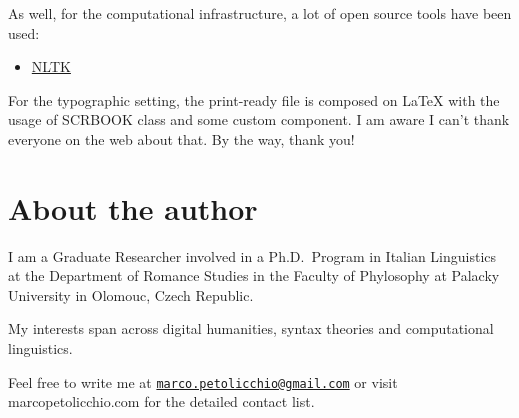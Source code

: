 \documentclass[a4paper,twoside,11pt,chapterprefix=false,bibliography=totocnumbered]{scrbook}
\providecommand{\tightlist}{%
  \setlength{\itemsep}{0pt}\setlength{\parskip}{0pt}}
\theoremstyle{definition}
\theoremstyle{definition}
\theoremstyle{definition}
\theoremstyle{remark}
\begin{document}
As well, for the computational infrastructure, a lot of open source
tools have been used:

\begin{itemize}
\tightlist
\item
  \href{https://bookdown.org}{NLTK}
\end{itemize}

For the typographic setting, the print-ready file is composed on LaTeX
with the usage of SCRBOOK class and some custom component. I am aware I
can't thank everyone on the web about that. By the way, thank you!

\section{About the author}\label{about-the-author}

I am a Graduate Researcher involved in a Ph.D.~Program in Italian
Linguistics at the Department of Romance Studies in the Faculty of
Phylosophy at Palacky University in Olomouc, Czech Republic.

My interests span across digital humanities, syntax theories and
computational linguistics.

Feel free to write me at
\href{mailto:marco.petolicchio@gmail.com}{\nolinkurl{marco.petolicchio@gmail.com}}
or visit marcopetolicchio.com for the detailed contact list.


\end{document}
